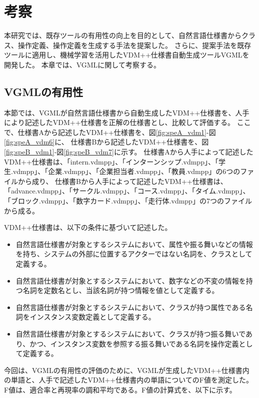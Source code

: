 \chapter{考察}
\label{cha:Discussion}

本研究では、既存ツールの有用性の向上を目的として、自然言語仕様書からクラス、操作定義、操作定義を生成する手法を提案した。
さらに、提案手法を既存ツールに適用し、機械学習を活用したVDM++仕様書自動生成ツールVGMLを開発した。
本章では、VGMLに関して考察する。

\section{VGMLの有用性}
本節では、VGMLが自然言語仕様書から自動生成したVDM++仕様書を、人手により記述したVDM++仕様書を正解の仕様書とし、比較して評価する。
ここで、仕様書Aから記述したVDM++仕様書を、図\ref{fig:speA_vdm1}-図\ref{fig:speA_vdm6}に、
仕様書Bから記述したVDM++仕様書を、図\ref{fig:speB_vdm1}-図\ref{fig:speB_vdm7}に示す。
仕様書Aから人手によって記述したVDM++仕様書は、「intern.vdmpp」、「インターンシップ.vdmpp」、「学生.vdmpp」、「企業.vdmpp」、「企業担当者.vdmpp」、「教員.vdmpp」の6つのファイルから成り、
仕様書Bから人手によって記述したVDM++仕様書は、「advance.vdmpp」、「サークル.vdmpp」、「コース.vdmpp」、「タイム.vdmpp」、「ブロック.vdmpp」、「数字カード.vdmpp」、「走行体.vdmpp」の7つのファイルから成る。

VDM++仕様書は、以下の条件に基づいて記述した。

\begin{itemize}
    \item 自然言語仕様書が対象とするシステムにおいて、属性や振る舞いなどの情報を持ち、システムの外部に位置するアクターではない名詞を、クラスとして定義する。
    \item 自然言語仕様書が対象とするシステムにおいて、数字などの不変の情報を持つ名詞を定数名とし、当該名詞が持つ情報を値として定義する。
    \item 自然言語仕様書が対象とするシステムにおいて、クラスが持つ属性である名詞をインスタンス変数定義として定義する。
    \item 自然言語仕様書が対象とするシステムにおいて、クラスが持つ振る舞いであり、かつ、インスタンス変数を参照する振る舞いである名詞を操作定義として定義する。
\end{itemize}

今回は、VGMLの有用性の評価のために、VGMLが生成したVDM++仕様書内の単語と、人手で記述したVDM++仕様書内の単語についてのF値\cite{F_value}を測定した。
F値は、適合率と再現率の調和平均である。F値の計算式を、以下に示す。

